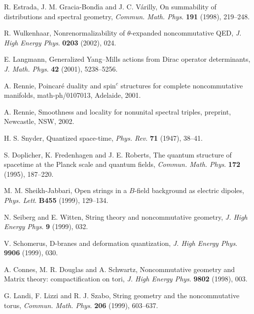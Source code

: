 \documentclass[a4paper,12pt]{article}
\newcommand{\1}{\mathbf{1}}         %
\newcommand{\7}{\dagger}            %
\newcommand{\8}{\bullet}            %
\renewcommand{\.}{\cdot}            %
\renewcommand{\:}{\colon}           %
\begin{document}
\begin{thebibliography}{74}
R. Estrada, J. M. Gracia-Bond\'{\i}a and J. C. V\'arilly,
On summability of distributions and spectral geometry,
\textit{Commun. Math. Phys}. {\bf 191} (1998), 219--248.

R. Wulkenhaar,
Nonrenormalizability of $\theta$-expanded noncommutative QED,
\textit{J. High Energy Phys}. {\bf 0203} (2002), 024.

E. Langmann,
Generalized Yang--Mills actions from Dirac operator determinants,
\textit{J. Math. Phys}. {\bf 42} (2001), 5238--5256.

A. Rennie,
Poincar\'e duality and spin$^c$ structures for complete
noncommutative manifolds,
math-ph/0107013, Adelaide, 2001.

A. Rennie,
Smoothness and locality for nonunital spectral triples,
preprint, Newcastle, NSW, 2002.

H. S. Snyder,
Quantized space-time,
\textit{Phys. Rev}. {\bf 71} (1947), 38--41.

S. Doplicher, K. Fredenhagen and J. E. Roberts,
The quantum structure of spacetime at the Planck scale and quantum
fields,
\textit{Commun. Math. Phys}. {\bf 172} (1995), 187--220.

M. M. Sheikh-Jabbari,
Open strings in a $B$-field background as electric dipoles,
\textit{Phys. Lett}. {\bf B455} (1999), 129--134.

N. Seiberg and E. Witten,
String theory and noncommutative geometry,
\textit{J. High Energy Phys}. {\bf 9} (1999), 032.

V. Schomerus,
D-branes and deformation quantization,
\textit{J. High Energy Phys}. {\bf 9906} (1999), 030.

A. Connes, M. R. Douglas and A. Schwartz,
Noncommutative geometry and Matrix theory:
compactification on tori,
\textit{J. High Energy Phys}. {\bf 9802} (1998), 003.

G. Landi, F. Lizzi and R. J. Szabo,
String geometry and the noncommutative torus,
\textit{Commun. Math. Phys}. {\bf 206} (1999), 603--637.


\end{thebibliography}
\end{document}
